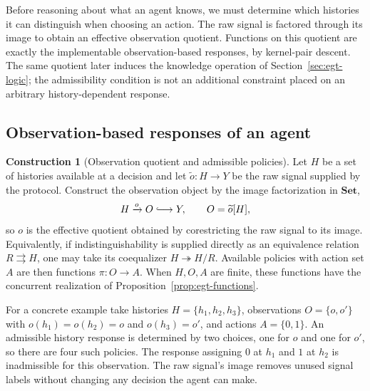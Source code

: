 \documentclass[11pt,a4paper]{article}
\numberwithin{equation}{section}
\theoremstyle{definition}
\newtheorem{construction}[construction]{Construction}
\theoremstyle{remark}
\theoremstyle{plain}
\begin{document}
Before reasoning about what an agent knows, we must determine which
histories it can distinguish when choosing an action. The raw signal
is factored through its image to obtain an effective observation quotient.
Functions on this quotient are exactly the implementable observation-based
responses, by kernel-pair descent. The same quotient later induces the
knowledge operation of Section~\ref{sec:egt-logic}; the admissibility
condition is not an additional constraint placed on an arbitrary
history-dependent response.

\subsection{Observation-based responses of an agent}

\begin{construction}[Observation quotient and admissible policies]
Let $H$ be a set of histories available at a decision and let
$\widetilde o:H\to Y$ be the raw signal supplied by the protocol. Construct
the observation object by the image factorization in $\mathbf{Set}$,
\[
 H\xrightarrow{o}O\lhook\joinrel\longrightarrow Y,
 \qquad O=\widetilde o[H],
\]
so $o$ is the effective quotient obtained by corestricting the raw signal to
its image. Equivalently, if indistinguishability is supplied directly as an
equivalence relation $R\rightrightarrows H$, one may take its coequalizer
$H\twoheadrightarrow H/R$. Available policies with action set $A$ are then
functions $\pi:O\to A$. When $H,O,A$ are finite, these functions have the
concurrent realization of Proposition~\ref{prop:egt-functions}.
\end{construction}

For a concrete example take histories $H=\{h_1,h_2,h_3\}$, observations
$O=\{o,o'\}$ with $o(h_1)=o(h_2)=o$ and $o(h_3)=o'$, and actions
$A=\{0,1\}$. An admissible history response is determined by two choices,
one for $o$ and one for $o'$, so there are four such policies. The response
assigning $0$ at $h_1$ and $1$ at $h_2$ is inadmissible for this observation.
The raw signal's image removes unused signal labels without changing
any decision the agent can make.
\end{document}
